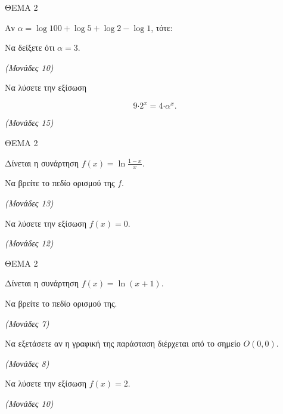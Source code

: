 \documentclass[11pt,a4paper,twoside]{book}
\newcommand{\monades}[1]{\hfill \textit{(Μονάδες #1)}}
\begin{document}
\vspace{4mm}

ΘΕΜΑ 2

Αν $\alpha = \log 100 + \log 5 + \log 2 - \log 1$, τότε:

\begin{alist}
\item Να δείξετε ότι $\alpha = 3$.

\monades{10}

\item Να λύσετε την εξίσωση

\begin{equation*}9{\cdot 2}^{x} = 4{\cdot \alpha}^{x}.\end{equation*}

\monades{15}
\end{alist}

\vspace{4mm}

ΘΕΜΑ 2

Δίνεται η συνάρτηση $f(x) = \ln\frac{1 - x}{x}$.

\begin{alist}
\item Να βρείτε το πεδίο ορισμού της $f$.

\monades{13}

\item Να λύσετε την εξίσωση $f(x) = 0$.

\monades{12}
\end{alist}

\vspace{4mm}

ΘΕΜΑ 2

Δίνεται η συνάρτηση $f(x) = \ln(x + 1)$.

\begin{alist}
\item Να βρείτε το πεδίο ορισμού της.

\monades{7}

\item Να εξετάσετε αν η γραφική της παράσταση διέρχεται από το σημείο $O(0, 0)$.

\monades{8}

\item Να λύσετε την εξίσωση $f(x) = 2$.

\monades{10}
\end{alist}

\vspace{4mm}
\end{document}
